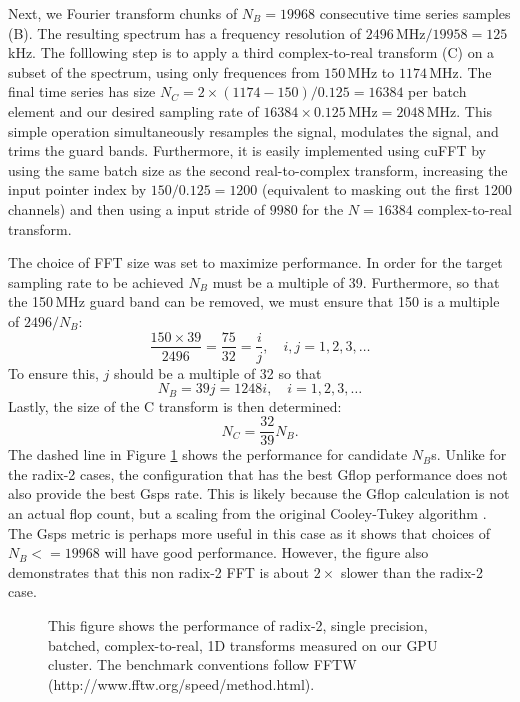 \documentclass[11pt,preprint]{aastex}
\begin{document}
Next, we Fourier transform chunks of $N_B = 19968$ consecutive time series samples (B).  The resulting 
spectrum has a frequency resolution of $2496$\,MHz$/19958=125$\,kHz.  The folllowing step is to apply a third
complex-to-real transform (C) on a subset of the spectrum, using only frequences from $150$\,MHz to $1174$\,MHz.  
The final time series has size $N_C= 2\times(1174-150)/0.125=16384$ per batch element and our desired 
sampling rate of 
$16384 \times 0.125$\,MHz$ = 2048$\,MHz.  This simple operation simultaneously resamples the signal, modulates 
the signal, and trims the guard bands.  Furthermore, it is easily implemented using cuFFT by using the same 
batch size as the second real-to-complex transform, increasing the input pointer index by $150 / 0.125 = 1200$
(equivalent to masking out the first 1200 channels) and then using a input stride of $9980$ for the 
$N=16384$ complex-to-real transform.

The choice of FFT size was set to maximize performance.  In order for the target sampling rate to be achieved
$N_B$ must be a multiple of 39.  Furthermore, so that the 150\,MHz guard band can be removed, we must ensure that 
150 is a multiple of $2496/N_B$:
\begin{equation}
\frac{150\times39}{2496} = \frac{75}{32} = \frac{i}{j}, \quad i,j = 1, 2,3, \ldots
\end{equation}
To ensure this, $j$ should be a multiple of 32 so that 
\begin{equation}
N_B = 39j = 1248i, \quad i=1,2,3,\ldots
\end{equation}
Lastly, the size of the C transform is then determined:
\begin{equation}
N_C = \frac{32}{39} N_B.
\end{equation}
The dashed line in Figure \ref{fig:C2R_performance} shows the performance for candidate $N_B$s.  Unlike for 
the radix-2 cases, the configuration that has the best Gflop performance does not also provide the best Gsps
rate.  This is likely because the Gflop calculation is not an actual flop count, but a scaling from the 
original Cooley-Tukey algorithm \citep{cooley65}.  The Gsps metric is perhaps more useful in this case as it
shows that choices of $N_B <= 19968$ will have good performance.  However, the figure also demonstrates
that this non radix-2 FFT is about $2\times$ slower than the radix-2 case.

\begin{figure}[t!]
\caption{This figure shows the performance of radix-2, single precision, batched, complex-to-real, 1D transforms 
measured on our GPU cluster. The benchmark conventions follow FFTW  (http://www.fftw.org/speed/method.html).}
\label{fig:C2R_performance}
\end{figure}
\end{document}

